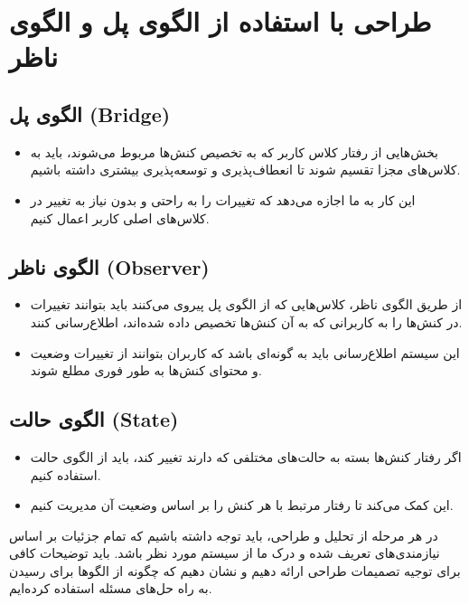 \section*{طراحی با استفاده از الگوی پل و الگوی ناظر}

\subsection*{الگوی پل (Bridge)}

\begin{itemize}
	\item بخش‌هایی از رفتار کلاس کاربر که به تخصیص کنش‌ها مربوط می‌شوند، باید به کلاس‌های مجزا تقسیم شوند تا انعطاف‌پذیری و توسعه‌پذیری بیشتری داشته باشیم.
	\item این کار به ما اجازه می‌دهد که تغییرات را به راحتی و بدون نیاز به تغییر در کلاس‌های اصلی کاربر اعمال کنیم.
\end{itemize}

\subsection*{الگوی ناظر (Observer)}

\begin{itemize}
	\item از طریق الگوی ناظر، کلاس‌هایی که از الگوی پل پیروی می‌کنند باید بتوانند تغییرات در کنش‌ها را به کاربرانی که به آن کنش‌ها تخصیص داده شده‌اند، اطلاع‌رسانی کنند.
	\item این سیستم اطلاع‌رسانی باید به گونه‌ای باشد که کاربران بتوانند از تغییرات وضعیت و محتوای کنش‌ها به طور فوری مطلع شوند.
\end{itemize}

\subsection*{الگوی حالت (State)}

\begin{itemize}
	\item اگر رفتار کنش‌ها بسته به حالت‌های مختلفی که دارند تغییر کند، باید از الگوی حالت استفاده کنیم.
	\item این کمک می‌کند تا رفتار مرتبط با هر کنش را بر اساس وضعیت آن مدیریت کنیم.
\end{itemize}

در هر مرحله از تحلیل و طراحی، باید توجه داشته باشیم که تمام جزئیات بر اساس نیازمندی‌های تعریف شده و درک ما از سیستم مورد نظر باشد. باید توضیحات کافی برای توجیه تصمیمات طراحی ارائه دهیم و نشان دهیم که چگونه از الگوها برای رسیدن به راه حل‌های مسئله استفاده کرده‌ایم.